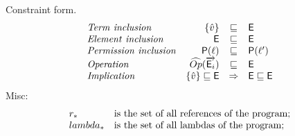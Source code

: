 Constraint form.
\[
\begin{array}{lrcl}
\mathit{Term\ inclusion} & \{\hat{v}\} & \sqsubseteq & \mathsf{E} \\
\mathit{Element\ inclusion} & \mathsf{E} & \sqsubseteq & \mathsf{E} \\
\mathit{Permission\ inclusion} & \mathsf{P}(\ell) & \sqsubseteq & \mathsf{P}(\ell') \\
\mathit{Operation} & \widehat{Op}(\overrightarrow{\mathsf{E}_i}) & \sqsubseteq & \mathsf{E} \\
\mathit{Implication} & \{\hat{v}\} \sqsubseteq \mathsf{E} & \Rightarrow & \mathsf{E} \sqsubseteq \mathsf{E} \\
\end{array}
\]
Misc:
\[
\begin{array}{l l}
r_* & $is the set of all references of the program;$\\
lambda_* & $is the set of all lambdas of the program;$\\
\end{array}
\]

